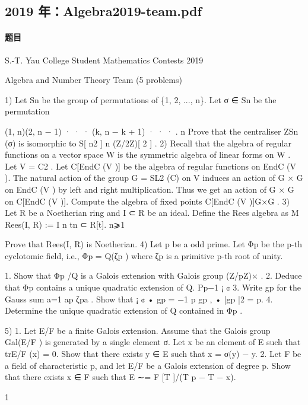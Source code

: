 \documentclass[UTF8,12pt]{ctexart}
\begin{document}
\subsection{2019 年：Algebra2019-team.pdf}
\paragraph{题目}
S.-T. Yau College Student Mathematics Contests 2019

Algebra and Number Theory Team (5 problems)

1) Let Sn be the group of permutations of \{1, 2, ..., n\}. Let σ ∈ Sn be the permutation

(1, n)(2, n − 1) · · · (k, n − k + 1) · · · . n Prove that the centraliser ZSn (σ) is isomorphic to S[ n2 ] n (Z/2Z)[ 2 ] . 2) Recall that the algebra of regular functions on a vector space W is the symmetric algebra of linear forms on W . Let V = C2 . Let C[EndC (V )] be the algebra of regular functions on EndC (V ). The natural action of the group G = SL2 (C) on V induces an action of G × G on EndC (V ) by left and right multiplication. Thus we get an action of G × G on C[EndC (V )]. Compute the algebra of fixed points C[EndC (V )]G×G . 3) Let R be a Noetherian ring and I ⊂ R be an ideal. Define the Rees algebra as M Rees(I, R) := I n tn ⊂ R[t]. n⩾1

Prove that Rees(I, R) is Noetherian. 4) Let p be a odd prime. Let Φp be the p-th cyclotomic field, i.e., Φp = Q(ζp ) where ζp is a primitive p-th root of unity.

1. Show that Φp /Q is a Galois extension with Galois group (Z/pZ)× . 2. Deduce that Φp contains a unique quadratic extension of Q. Pp−1 ¡ ¢ 3. Write gp for the Gauss sum a=1 ap ζpa . Show that ¡ ¢ • gp = −1 p gp , • |gp |2 = p. 4. Determine the unique quadratic extension of Q contained in Φp .

5) 1. Let E/F be a finite Galois extension. Assume that the Galois group Gal(E/F ) is generated by a single element σ. Let x be an element of E such that trE/F (x) = 0. Show that there exists y ∈ E such that x = σ(y) − y. 2. Let F be a field of characteristic p, and let E/F be a Galois extension of degree p. Show that there exists x ∈ F such that E ∼= F [T ]/(T p − T − x).

1
\end{document}
